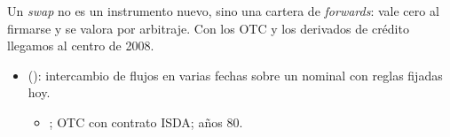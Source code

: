 \documentclass{article}
\begin{document}
\begin{columnas}
\begin{ideaclave}
Un \emph{swap} no es un instrumento nuevo, sino una cartera de \emph{forwards}: vale cero al firmarse y se valora por arbitraje. Con los OTC y los derivados de crédito llegamos al centro de 2008.
\end{ideaclave}

\begin{itemize}
\item {} (): intercambio de flujos en varias fechas sobre un nominal con reglas fijadas hoy.
  \begin{itemize}
  \item {}; OTC con contrato ISDA; años 80.
  \end{itemize}
\end{itemize}


\end{columnas}
\end{document}
